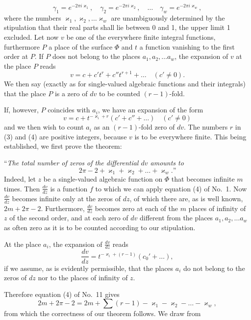 \documentclass{article}
\begin{document}
\[
\gamma_1 = e^{-2\pi i\varkappa_1}, \quad \gamma_2 = e^{-2\pi i\varkappa_2}, \quad \dots \quad \gamma_w = e^{-2\pi i\varkappa_w}, \tag{2}
\]
where the numbers $\varkappa_1, \varkappa_2, \dots \varkappa_w$ are unambiguously determined by the stipulation that their real parts shall lie between 0 and 1, the upper limit 1 excluded. Let now $v$ be one of the everywhere finite integral functions, furthermore $P$ a place of the surface $\Phi$ and $t$ a function vanishing to the first order at $P$. If $P$ does not belong to the places $a_1, a_2, \dots a_w$, the expansion of $v$ at the place $P$ reads
\[
v = c + c' t^r + c'' t^{r+1} + \dots \quad (c' \neq 0). \tag{3}
\]
We then say (exactly as for single-valued algebraic functions and their integrals) that the place $P$ is a zero of $dv$ to be counted $(r-1)$-fold.

If, however, $P$ coincides with $a_i$, we have an expansion of the form
\[
v = c + t^{-\varkappa_i + r}(c' + c'' + \dots) \quad (c' \neq 0) \tag{4}
\]
and we then wish to count $a_i$ as an $(r-1)$-fold zero of $dv$. The numbers $r$ in (3) and (4) are positive integers, because $v$ is to be everywhere finite. This being established, we first prove the theorem:

``\emph{The total number of zeros of the differential $dv$ amounts to}
\[
2\pi - 2 + \varkappa_1 + \varkappa_2 + \dots + \varkappa_w\text{.''}
\]
Indeed, let $z$ be a single-valued algebraic function on $\Phi$ that becomes infinite $m$ times. Then $\frac{dv}{dz}$ is a function $f$ to which we can apply equation (4) of No.~1. Now $\frac{dv}{dz}$ becomes infinite only at the zeros of $dz$, of which there are, as is well known, $2m+2\pi-2$. Furthermore, $\frac{dv}{dz}$ becomes zero at each of the $m$ places of infinity of $z$ of the second order, and at each zero of $dv$ different from the places $a_1, a_2, \dots a_w$ as often zero as it is to be counted according to our stipulation.

At the place $a_i$, the expansion of $\frac{dv}{dz}$ reads
\[
\frac{dv}{dz} = t^{-\varkappa_i + (r-1)} (c_0' + \dots),
\]
if we assume, as is evidently permissible, that the places $a_i$ do not belong to the zeros of $dz$ nor to the places of infinity of $z$.

Therefore equation (4) of No.~11 gives
\[
2m + 2\pi - 2 = 2m + \sum(r-1) - \varkappa_1 - \varkappa_2 - \dots - \varkappa_w,
\]
from which the correctness of our theorem follows. We draw from
\end{document}
